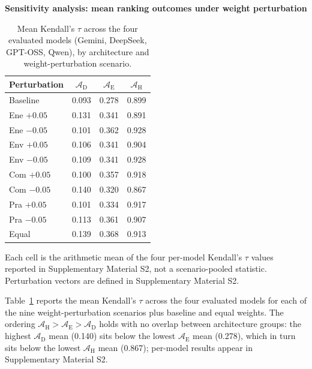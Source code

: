 \documentclass[a4paper,fleqn]{cas-dc}
\begin{document}
\begin{table}[htbp]
\begin{threeparttable}
\small
\centering
\textbf{Sensitivity analysis: mean ranking outcomes under weight perturbation}
\renewcommand{\arraystretch}{1.15}
\begin{tabular}{@{} l ccc @{}}
\toprule
\textbf{Perturbation} & $\mathcal{A}_{\text{D}}$ & $\mathcal{A}_{\text{E}}$ & $\mathcal{A}_{\text{H}}$ \\
\midrule
Baseline    & 0.093 & 0.278 & 0.899 \\
Ene $+0.05$ & 0.131 & 0.341 & 0.891 \\
Ene $-0.05$ & 0.101 & 0.362 & 0.928 \\
Env $+0.05$ & 0.106 & 0.341 & 0.904 \\
Env $-0.05$ & 0.109 & 0.341 & 0.928 \\
Com $+0.05$ & 0.100 & 0.357 & 0.918 \\
Com $-0.05$ & 0.140 & 0.320 & 0.867 \\
Pra $+0.05$ & 0.101 & 0.334 & 0.917 \\
Pra $-0.05$ & 0.113 & 0.361 & 0.907 \\
Equal       & 0.139 & 0.368 & 0.913 \\
\bottomrule
\end{tabular}
\renewcommand{\arraystretch}{1.0}
\begin{tablenotes}
\item Each cell is the arithmetic mean of the four per-model Kendall's $\tau$ values reported in Supplementary Material S2, not a scenario-pooled statistic. Perturbation vectors are defined in Supplementary Material S2.
\end{tablenotes}
\end{threeparttable}
\caption{Mean Kendall's $\tau$ across the four evaluated models (Gemini, DeepSeek, GPT-OSS, Qwen), by architecture and weight-perturbation scenario.}
\label{tab:sensitivity_pooled}
\end{table}

Table~\ref{tab:sensitivity_pooled} reports the mean Kendall's $\tau$ across the four evaluated models for each of the nine weight-perturbation scenarios plus baseline and equal weights. The ordering $\mathcal{A}_{\text{H}} > \mathcal{A}_{\text{E}} > \mathcal{A}_{\text{D}}$ holds with no overlap between architecture groups: the highest $\mathcal{A}_{\text{D}}$ mean (0.140) sits below the lowest $\mathcal{A}_{\text{E}}$ mean (0.278), which in turn sits below the lowest $\mathcal{A}_{\text{H}}$ mean (0.867); per-model results appear in Supplementary Material S2.
\end{document}
